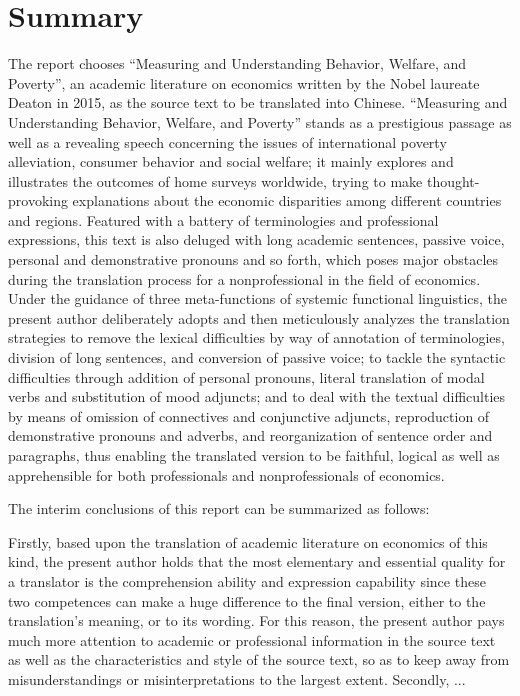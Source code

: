 \chapter*{Summary}
The report chooses “Measuring and Understanding Behavior, Welfare, and Poverty”, an academic literature on economics written by the Nobel laureate Deaton in 2015, as the source text to be translated into Chinese. “Measuring and Understanding Behavior, Welfare, and Poverty” stands as a prestigious passage as well as a revealing speech concerning the issues of international poverty alleviation, consumer behavior and social welfare; it mainly explores and illustrates the outcomes of home surveys worldwide, trying to make thought-provoking explanations about the economic disparities among different countries and regions. Featured with a battery of terminologies and professional expressions, this text is also deluged with long academic sentences, passive voice, personal and demonstrative pronouns and so forth, which poses major obstacles during the translation process for a nonprofessional in the field of economics. Under the guidance of three meta-functions of systemic functional linguistics, the present author deliberately adopts and then meticulously analyzes the translation strategies to remove the lexical difficulties by way of annotation of terminologies, division of long sentences, and conversion of passive voice; to tackle the syntactic difficulties through addition of personal pronouns, literal translation of modal verbs and substitution of mood adjuncts; and to deal with the textual difficulties by means of omission of connectives and conjunctive adjuncts, reproduction of demonstrative pronouns and adverbs, and reorganization of sentence order and paragraphs, thus enabling the translated version to be faithful, logical as well as apprehensible for both professionals and nonprofessionals of economics.

The interim conclusions of this report can be summarized as follows:

Firstly, based upon the translation of academic literature on economics of this kind, the present author holds that the most elementary and essential quality for a translator is the comprehension ability and expression capability since these two competences can make a huge difference to the final version, either to the translation’s meaning, or to its wording. For this reason, the present author pays much more attention to academic or professional information in the source text as well as the characteristics and style of the source text, so as to keep away from misunderstandings or misinterpretations to the largest extent.
Secondly, ...

